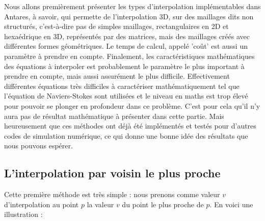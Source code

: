 Nous allons premièrement présenter les types d'interpolation implémentables dans Antares, à savoir, qui permette de l'interpolation 3D, sur des maillages dits non structurés, c'est-à-dire pas de simples maillages, rectangulaires en 2D et hexaédrique en 3D, représentés par des matrices, mais des maillages créés avec différentes formes géométriques.
Le temps de calcul, appelé 'coût' est aussi un paramètre à prendre en compte.
Finalement, les caractéristiques mathématiques des équations à interpoler est probablement le paramètre le plus important à prendre en compte, mais aussi assurément le plus difficile. Effectivement différentes équations très difficiles à caractériser mathématiquement tel que l'équation de Naviers-Stokes sont utilisées et le niveau en maths est trop élevé pour pouvoir se plonger en profondeur dans ce problème. C'est pour cela qu'il n'y aura pas de résultat mathématique à présenter dans cette partie. Mais heureusement que ces méthodes ont déjà été implémentés et testés pour d'autres codes de simulation numérique, ce qui donne une bonne idée des résultats que nous pouvons espérer.


\subsection{L'interpolation par voisin le plus proche}
Cette première méthode est très simple : nous prenons comme valeur \( v \) d'interpolation au point \( p \) la valeur \( v \) du point le plus proche de \( p \).
En voici une illustration :

\vspace{0.5cm}

\begin{center}
\end{center}

